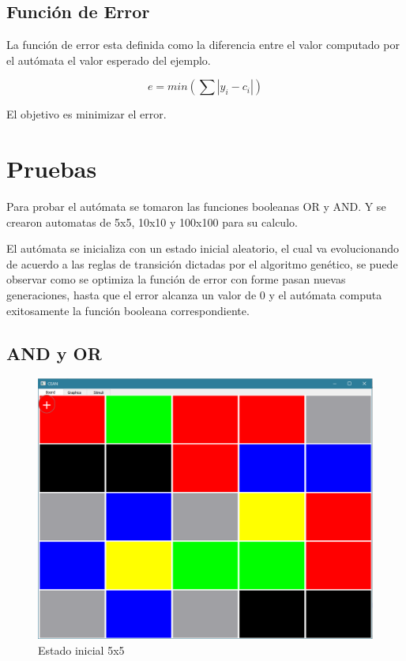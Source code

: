 \documentclass[]{article}
\begin{document}
\subsection{Función de Error}

La función de error esta definida como la diferencia entre el valor computado por el autómata el valor esperado del ejemplo.

\begin{equation}
e = min(\sum |y_{i} - c_{i}|)
\end{equation}

El objetivo es minimizar el error.

\section{Pruebas}

Para probar el autómata se tomaron las funciones booleanas OR y AND. Y se crearon automatas de 5x5, 10x10 y 100x100
para su calculo.

El autómata se inicializa con un estado inicial aleatorio, el cual va evolucionando de acuerdo a las reglas de transición dictadas 
por el algoritmo genético, se puede observar como se optimiza la función de error con forme pasan nuevas generaciones, hasta que el error
alcanza un valor de 0 y el autómata computa exitosamente la función booleana correspondiente.

\subsection{AND y OR}

\begin{figure}
\centering
\includegraphics[width=0.7\linewidth]{or_estado}
\caption{Estado inicial 5x5}
\label{fig:or_estado}
\end{figure}
\end{document}
